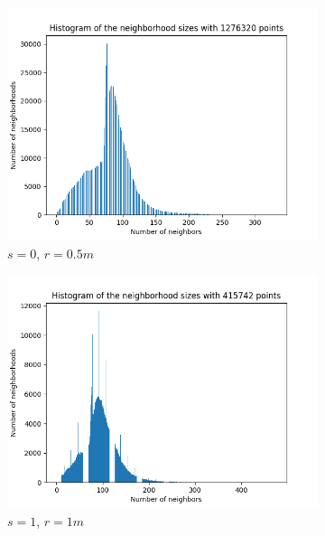 \documentclass[a4paper, 11pt]{article}
\begin{document}
\begin{figure}
    \begin{subfigure}{0.5\textwidth}
        \centering
        \includegraphics[width=\textwidth]{../Figures/neigh_hist_scale0.png}
        \caption{$s=0$, $r=0.5m$}
    \end{subfigure}
    \hfill
    \begin{subfigure}{0.5\textwidth}
        \centering
        \includegraphics[width=\textwidth]{../Figures/neigh_hist_scale1.png}
        \caption{$s=1$, $r=1m$}
    \end{subfigure}
    \hfill
    \begin{subfigure}{0.5\textwidth}
        \centering

\end{subfigure}
\end{figure}
\end{document}
